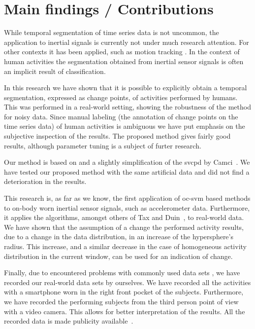 \section{Main findings / Contributions}\label{sec:main_findings}
While temporal segmentation of time series data is not uncommon, the application to inertial signals is currently not under much research attention.
For other contexts it has been applied, such as motion tracking \cite{barbivc2004segmenting,li2007segmentation}.
In the context of human activities the segmentation obtained from inertial sensor signals is often an implicit result of classification.

In this research we have shown that it is possible to explicitly obtain a temporal segmentation, expressed as change points, of activities performed by humans.
This was performed in a real-world setting, showing the robustness of the method for noisy data.
Since manual labeling (the annotation of change points on the time series data) of human activities is ambiguous we have put emphasis on the subjective inspection of the results.
The proposed method gives fairly good results, although parameter tuning is a subject of furter research.

Our method is based on and a slightly simplification of the \gls{svcpd} by Camci~\cite{camci2010change}.
We have tested our proposed method with the same artificial data and did not find a deterioration in the results.

This research is, as far as we know, the first application of \gls{oc-svm} based methods to on-body worn inertial sensor signals, such as accelerometer data.
Furthermore, it applies the algorithms, amongst others of Tax and Duin~\cite{tax1999support}, to real-world data.
We have shown that the assumption of a change the performed activity results, due to a change in the data distribution, in an increase of the hypersphere's radius.
This increase, and a similar decrease in the case of homogeneous activity distribution in the current window, can be used for an indication of change.

Finally, due to encountered problems with commonly used data sets \cite{kwapisz2011activity,anguita2012human}, we have recorded our real-world data sets by ourselves.
We have recorded all the activities with a smartphone worn in the right front pocket of the subjects.
Furthermore, we have recorded the performing subjects from the third person point of view with a video camera.
This allows for better interpretation of the results.
All the recorded data is made publicity available~\cite{vlasveld2013continuous}.

